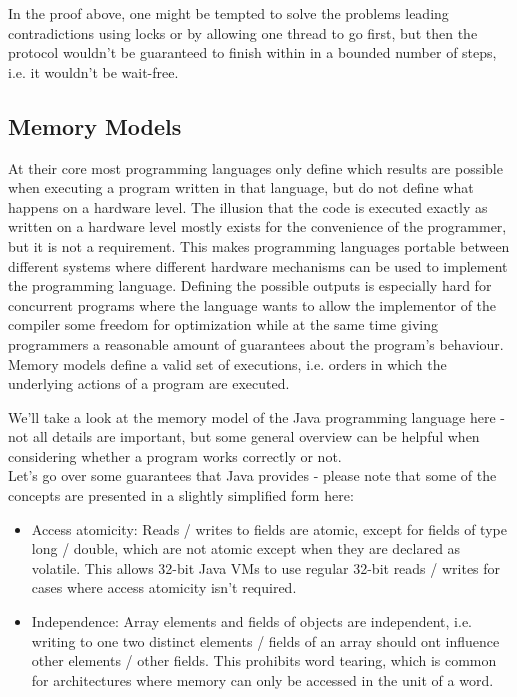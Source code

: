 \documentclass[main]{subfiles}
\begin{document}
In the proof above, one might be tempted to solve the problems leading contradictions using locks or by allowing one thread to go first, but then the protocol wouldn't be guaranteed to finish within in a bounded number of steps, i.e. it wouldn't be wait-free.
 

\subsection{Memory Models} \label{memory models}
At their core most programming languages only define which results are possible when executing a program written in that language, but do not define what happens on a hardware level. The illusion that the code is executed exactly as written on a hardware level mostly exists for the convenience of the programmer, but it is not a requirement. This makes programming languages portable between different systems where different hardware mechanisms can be used to implement the programming language. Defining the possible outputs is especially hard for concurrent programs where the language wants to allow the implementor of the compiler some freedom for optimization while at the same time giving programmers a reasonable amount of guarantees about the program's behaviour. Memory models define a valid set of executions, i.e. orders in which the underlying actions of a program are executed.

We'll take a look at the memory model of the Java programming language here - not all details are important, but some general overview can be helpful when considering whether a program works correctly or not. \\
Let's go over some guarantees that Java provides - please note that some of the concepts are presented in a slightly simplified form here:
\begin{itemize}
    \item Access atomicity: Reads / writes to fields are atomic, except for fields of type long / double, which are not atomic except when they are declared as volatile. This allows 32-bit Java VMs to use regular 32-bit reads / writes for cases where access atomicity isn't required.
    \item Independence: Array elements and fields of objects are independent, i.e. writing to one two distinct elements / fields of an array should ont influence other elements / other fields. This prohibits word tearing, which is common for architectures where memory can only be accessed in the unit of a word.
\end{itemize}
\end{document}

